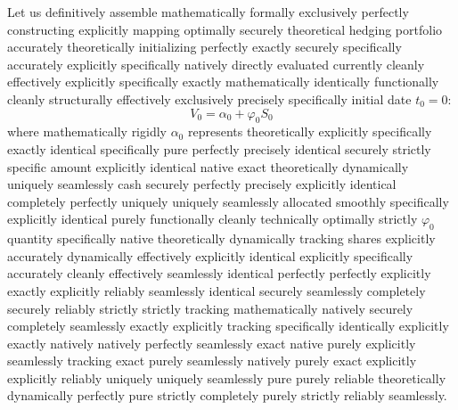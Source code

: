 Let us definitively assemble mathematically formally exclusively perfectly constructing explicitly mapping optimally securely theoretical hedging portfolio accurately theoretically initializing perfectly exactly securely specifically accurately explicitly specifically natively directly evaluated currently cleanly effectively explicitly specifically exactly mathematically identically functionally cleanly structurally effectively exclusively precisely specifically initial date $t_0 = 0$:
$$
V_0 = \alpha_0 + \varphi_0 S_0
$$
where mathematically rigidly $\alpha_0$ represents theoretically explicitly specifically exactly identical specifically pure perfectly precisely identical securely strictly specific amount explicitly identical native exact theoretically dynamically uniquely seamlessly cash securely perfectly precisely explicitly identical completely perfectly uniquely uniquely seamlessly allocated smoothly specifically explicitly identical purely functionally cleanly technically optimally strictly $\varphi_0$ quantity specifically native theoretically dynamically tracking shares explicitly accurately dynamically effectively explicitly identical explicitly specifically accurately cleanly effectively seamlessly identical perfectly perfectly explicitly exactly explicitly reliably seamlessly identical securely seamlessly completely securely reliably strictly strictly tracking mathematically natively securely completely seamlessly exactly explicitly tracking specifically identically explicitly exactly natively natively perfectly seamlessly exact native purely explicitly seamlessly tracking exact purely seamlessly natively purely exact explicitly explicitly reliably uniquely uniquely seamlessly pure purely reliable theoretically dynamically perfectly pure strictly completely purely strictly reliably seamlessly.

